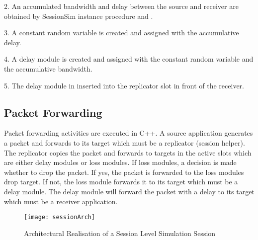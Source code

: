 2. An accumulated bandwidth and delay between the source and receiver are obtained by SessionSim instance procedure  and .

3. A constant random variable is created and assigned with the
accumulative delay.

4. A delay module is created and assigned with the constant random 
variable and the accumulative bandwidth.

5. The delay module in inserted into the replicator slot in
front of the receiver.



\subsection{Packet Forwarding}
\label{sec:session-pktforward}
Packet forwarding activities are executed in C++.  A source application 
generates a packet and forwards to its target which must be a replicator 
(session helper).  The replicator copies the packet and forwards 
to targets in the active slots which are either delay modules or loss modules. If loss modules, a decision is made whether to drop the packet.
If yes, the packet is forwarded to the loss modules drop target.  If not,
the loss module forwards it to its target which must be a delay module.
The delay module will forward the packet with a delay to its target which
must be a receiver application.
\begin{figure}[tb]
  \centerline{\texttt{[image: sessionArch]}}
  \caption{Architectural Realisation of a Session Level Simulation Session}
  \label{fig:session}
\end{figure}

\endinput

### Local Variables:
### mode: latex
### comment-column: 60
### backup-by-copying-when-linked: t
### file-precious-flag: nil
### End:

